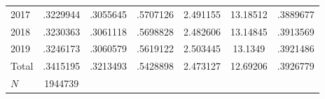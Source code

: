 {\begin{longtable}{l*{1}{cccccc}}
2017        &    .3229944&    .3055645&    .5707126&    2.491155&    13.18512&    .3889677\\
2018        &    .3230363&    .3061118&    .5698828&    2.482606&    13.14845&    .3913569\\
2019        &    .3246173&    .3060579&    .5619122&    2.503445&     13.1349&    .3921486\\
Total       &    .3415195&    .3213493&    .5428898&    2.473127&    12.69206&    .3926779\\
\hline
\(N\)       &     1944739&            &            &            &            &            \\
\hline\hline
\end{longtable}
}
